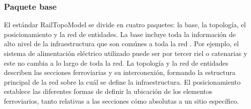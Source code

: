 \subsubsection{Paquete base}

    El estándar RailTopoModel se divide en cuatro paquetes: la base, la topología, el posicionamiento y la red de entidades. La base incluye toda la información de alto nivel de la infraestructura que son comúnes a toda la red \cite{Paper_146}. Por ejemplo, el sistema de alimentación eléctrico utilizado puede ser por tercer riel o catenarias y este no cambia a lo largo de toda la red. La topología y la red de entidades describen las secciones ferroviarias y su interconexión, formando la estructura principal de la red sobre la cuál se define la infraestructura. El posicionamiento establece las diferentes formas de definir la ubicación de los elementos ferroviarios, tanto relativas a las secciones cómo absolutas a un sitio específico.
